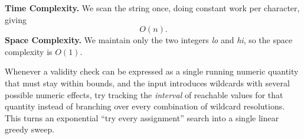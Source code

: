 \begin{complexitybox}
\textbf{Time Complexity.} We scan the string once, doing constant work per
character, giving
\[
  O(n).
\]
\textbf{Space Complexity.} We maintain only the two integers \textit{lo} and
\textit{hi}, so the space complexity is $O(1)$.
\end{complexitybox}

\begin{takeawaybox}
Whenever a validity check can be expressed as a single running numeric
quantity that must stay within bounds, and the input introduces wildcards
with several possible numeric effects, try tracking the \emph{interval} of
reachable values for that quantity instead of branching over every
combination of wildcard resolutions. This turns an exponential
``try every assignment'' search into a single linear greedy sweep.
\end{takeawaybox}
